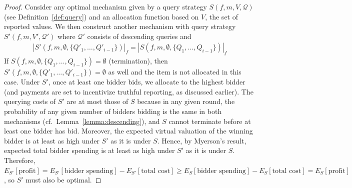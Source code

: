 \begin{proof}
Consider any optimal mechanism given by a
query strategy $S(f, m, V, \mathcal Q)$ (see Definition~\ref{def:query}) and an
allocation function based on $V$, the set of reported values.
We then construct another mechanism
with query strategy $S'(f, m, V', \mathcal Q')$ where $\mathcal Q'$
consists of descending queries
and 
\begin{align*}
|S'(f, m, \emptyset, \{Q'_1, \ldots, Q'_{i-1}\})|_f %
  = |S(f, m, \emptyset, \{Q_1, \ldots, Q_{i-1}\})|_f
\end{align*}
If $S(f, m, \emptyset, \{Q_1, \ldots,
Q_{i-1}\})=\emptyset$ (termination), then $S'(f, m, \emptyset, \{Q'_1, \ldots,
Q'_{i-1}\})=\emptyset$ as well and the item is not allocated in this case.
Under $S'$, once at least one bidder bids, we allocate to the highest
bidder (and payments are set to incentivize truthful reporting, as
discussed earlier).  The querying costs of $S'$ are at most those of $S$
because in any given round, the probability of any given number of bidders
bidding is the same in both mechanisms (cf.~Lemma~\ref{lemma:descending}), and $S$ cannot terminate before at least one bidder has bid. 
Moreover, the expected virtual valuation of the winning bidder is at
least as high under $S'$ as it is under $S$.
Hence, by Myerson's result, expected total bidder spending is at least 
as high under $S'$ as it is under $S$.
Therefore,
 $E_{S'}[\text{profit}]
= E_{S'}[\text{bidder spending}] - E_{S'}[\text{total cost}]
 \geq E_{S}[\text{bidder spending}] - E_{S}[\text{total cost}]
= E_{S}[\text{profit}]$, so $S'$ must also be optimal.

\end{proof}
